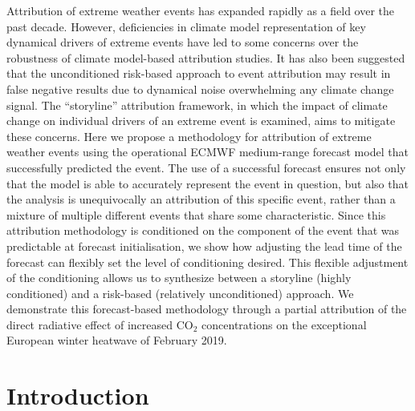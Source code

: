   Attribution of extreme weather events has expanded rapidly as a field over the past decade. However, deficiencies in climate model representation of key dynamical drivers of extreme events have led to some concerns over the robustness of climate model-based attribution studies. It has also been suggested that the unconditioned risk-based approach to event attribution may result in false negative results due to dynamical noise overwhelming any climate change signal. The “storyline” attribution framework, in which the impact of climate change on individual drivers of an extreme event is examined, aims to mitigate these concerns. Here we propose a methodology for attribution of extreme weather events using the operational ECMWF medium-range forecast model that successfully predicted the event. The use of a successful forecast ensures not only that the model is able to accurately represent the event in question, but also that the analysis is unequivocally an attribution of this specific event, rather than a mixture of multiple different events that share some characteristic. Since this attribution methodology is conditioned on the component of the event that was predictable at forecast initialisation, we show how adjusting the lead time of the forecast can flexibly set the level of conditioning desired. This flexible adjustment of the conditioning allows us to synthesize between a storyline (highly conditioned) and a risk-based (relatively unconditioned) approach. We demonstrate this forecast-based methodology through a partial attribution of the direct radiative effect of increased CO$_2$ concentrations on the exceptional European winter heatwave of February 2019.

\section{Introduction}\label{ch3:intro}

